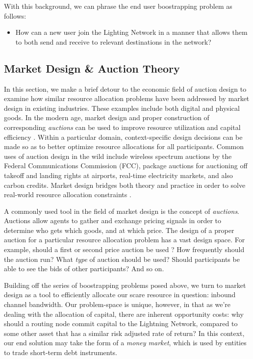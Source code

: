 \documentclass[10pt,a4paper]{article}
\theoremstyle{definition}
\begin{document}
With this background, we can phrase the end user boostrapping problem as
follows:

\begin{itemize}
        \item How can a new user join the Lighting Network in a manner that
            allows them to both send and receive to relevant destinations in
            the network?
\end{itemize}


\subsection{Market Design \& Auction Theory}

In this section, we make a brief detour to the economic field of auction design
to examine how similar resource allocation problems have been addressed by
market design in existing industries. These examples include both digital and
physical goods. In the modern age, market design and proper construction of
corresponding \emph{auctions} can be used to improve resource utilization and
capital efficiency \cite{cramton2010}.  Within a particular domain,
context-specific design decisions can be made so as to better optimize resource
allocations for all participants. Common uses of auction design in the wild
include wireless spectrum auctions by the Federal Communications Commission
(FCC), package auctions for auctioning off takeoff and landing rights at
airports, real-time electricity markets, and also carbon credits. Market design
bridges both theory and practice in order to solve real-world resource
allocation constraints \cite{cramton2008}.

A commonly used tool in the field of market design is the concept of
\emph{auctions}.  Auctions allow agents to gather and exchange pricing signals
in order to determine who gets which goods, and at which price. The design of a
proper auction for a particular resource allocation problem has a vast design
space. For example, should a first or second price auction be used
\cite{auctionCS}? How frequently should the auction run? What \emph{type} of
auction should be used? Should participants be able to see the bids of other
participants? And so on.

Building off the series of boostrapping problems posed above, we turn to market
design as a tool to efficiently allocate our scare resource in question:
inbound channel bandwidth. Our problem-space is unique, however, in that as
we're dealing with the allocation of capital, there are inherent opportunity
costs: why should a routing node commit capital to the Lightning Network,
compared to some other asset that has a similar risk adjusted rate of return?
In this context, our end solution may take the form of a \emph{money market},
which is used by entities to trade short-term debt instruments.
\end{document}
